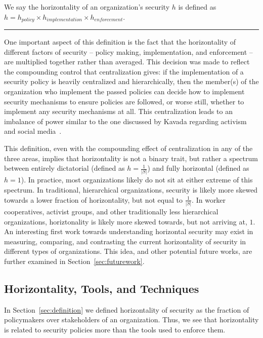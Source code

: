 \begin{definition}
We say the horizontality of an organization's security $h$ is defined as $h = 
h_{policy} \times h_{implementation} \times h_{enforcement}$.\\
\noindent\rule{.48\textwidth}{0.4pt}
\end{definition}

One important aspect of this definition is the fact that the horizontality of 
different factors of security -- policy making, implementation, and enforcement
-- are multiplied together rather than averaged. This decision was made to
reflect the compounding control that centralization gives: if the implementation
of a security policy is heavily centralized and hierarchically, then the
member(s) of the organization who implement the passed policies can decide
how to implement security mechanisms to ensure policies are followed, or worse
still, whether to implement any security mechanisms at all. This centralization
leads to an imbalance of power similar to the one discussed by Kavada regarding
activism and social media~\cite{kavada2020counterpublics}.


This definition, even with the compounding effect of centralization in any of
the three areas, implies that horizontality is not a binary trait, but rather a
spectrum between entirely dictatorial (defined as $h = \frac{1}{|S|}$) and fully
horizontal (defined as $h = 1$). In practice, most organizations likely do not
sit at either extreme of this spectrum. In traditional, hierarchical
organizations, security is likely more skewed towards a lower fraction of
horizontality, but not equal to $\frac{1}{|S|}$. In worker cooperatives, 
activist groups, and other traditionally less hierarchical organizations,
horiztonality is likely more skewed towards, but not arriving at, $1$. An
interesting first work towards understanding horizontal security may exist in
measuring, comparing, and contrasting the current horizontality of security in
different types of organizations. This idea, and other potential future works,
are further examined in Section~\ref{sec:futurework}.

\subsection{Horizontality, Tools, and Techniques}
In Section~\ref{sec:definition} we defined horizontality of security as the
fraction of policymakers over stakeholders of an organization. Thus, we see that
horizontality is related to security policies more than the tools used to 
enforce them. 

